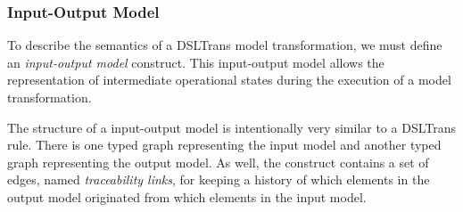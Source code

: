 \subsubsection*{Input-Output Model}

To describe the semantics of a DSLTrans model transformation, we must define an \textit{input-output model} construct. This input-output model allows the representation of intermediate operational states during the execution of a model transformation.

The structure of a input-output model is intentionally very similar to a DSLTrans rule. There is one typed graph representing the input model and another typed graph representing the output model. As well, the construct contains a set of edges, named \emph{traceability links}, for keeping a history of which elements in the output model originated from which elements in the input model.

